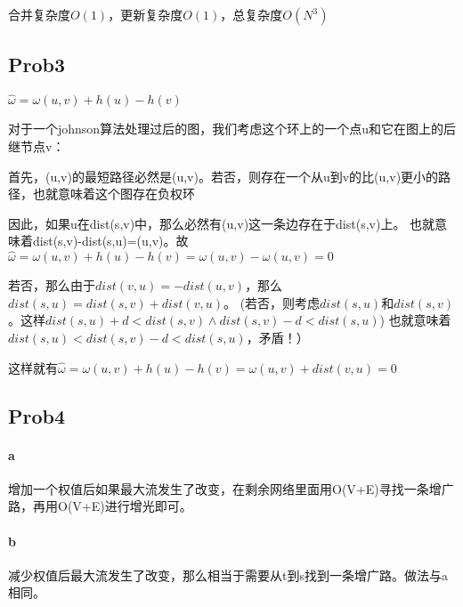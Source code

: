 \documentclass{ctexart}
\begin{document}
合并复杂度$O(1)$，更新复杂度$O(1)$，总复杂度$O(N^3)$

\subsection{Prob3}

$\hat{\omega} = \omega(u,v)+h(u)-h(v)$

对于一个johnson算法处理过后的图，我们考虑这个环上的一个点u和它在图上的后继节点v：

首先，(u,v)的最短路径必然是{(u,v)}。若否，则存在一个从u到v的比(u,v)更小的路径，也就意味着这个图存在负权环

因此，如果u在dist(s,v)中，那么必然有(u,v)这一条边存在于dist(s,v)上。
也就意味着dist(s,v)-dist(s,u)=(u,v)。故
$\hat{\omega}=\omega(u,v)+h(u)-h(v)=\omega(u,v)-\omega(u,v)=0$

若否，那么由于$dist(v,u)=-dist(u,v)$，那么$dist(s,u)=dist(s,v)+dist(v,u)$。
(若否，则考虑$dist(s,u)$和$dist(s,v)$。这样$dist(s,u)+d<dist(s,v) \land dist(s,v)-d<dist(s,u)$)
也就意味着$dist(s,u)<dist(s,v)-d<dist(s,u)$，矛盾！）

这样就有$\hat{\omega}=\omega(u,v)+h(u)-h(v)=\omega(u,v)+dist(v,u)=0$
\subsection{Prob4}
\paragraph{a} 增加一个权值后如果最大流发生了改变，在剩余网络里面用O(V+E)寻找一条增广路，再用O(V+E)进行增光即可。
\paragraph{b} 减少权值后最大流发生了改变，那么相当于需要从t到s找到一条增广路。做法与a相同。
\end{document}
